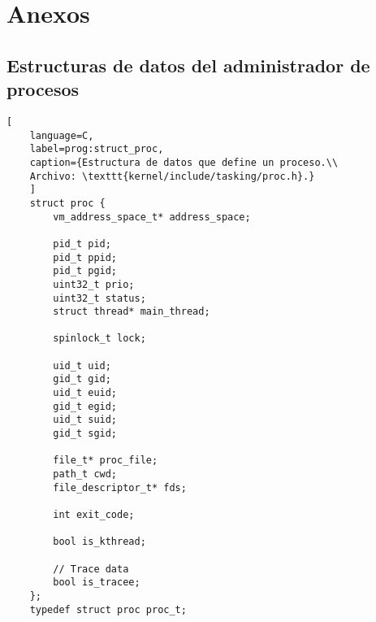 \section{Anexos \label{sec:anexos}}




\subsection{Estructuras de datos del administrador de procesos}
\begin{lstlisting}[
	language=C,
	label=prog:struct_proc,
	caption={Estructura de datos que define un proceso.\\
	Archivo: \texttt{kernel/include/tasking/proc.h}.}
	]
	struct proc {
		vm_address_space_t* address_space;
		
		pid_t pid;
		pid_t ppid;
		pid_t pgid;
		uint32_t prio;
		uint32_t status;
		struct thread* main_thread;
		
		spinlock_t lock;
		
		uid_t uid;
		gid_t gid;
		uid_t euid;
		gid_t egid;
		uid_t suid;
		gid_t sgid;
		
		file_t* proc_file;
		path_t cwd;
		file_descriptor_t* fds;
		
		int exit_code;
		
		bool is_kthread;
		
		// Trace data
		bool is_tracee;
	};
	typedef struct proc proc_t;
\end{lstlisting}

